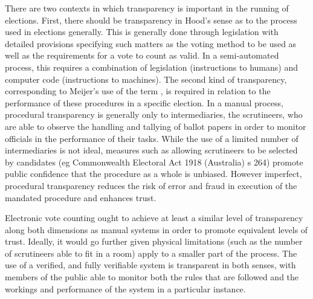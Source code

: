 There are two contexts in which transparency is important in the
running of elections. First, there should be transparency in Hood's
sense \citep{Hood:2001:T} as to the process used in elections generally. This is
generally done through legislation with detailed provisions
specifying such matters as the voting method to be used 
 as well as the requirements for a vote to count as valid.
In a semi-automated process, this requires a combination of
legislation (instructions to humans) and computer code (instructions
to machines). The second kind of transparency, corresponding to
Meijer’s use of the term \citep{Meijer:2014:T}, is required in relation to the
performance of these procedures in a specific election. In a manual
process, procedural transparency is generally only to
intermediaries, the scrutineers, who are able to observe the
handling and tallying of ballot papers in order to monitor officials
in the performance of their tasks. While the use of a limited number
of intermediaries is not ideal, measures such as allowing
scrutineers to be selected by candidates (eg Commonwealth Electoral
Act 1918 (Australia) s 264) promote public confidence that the
procedure as a whole is unbiased. However imperfect, procedural
transparency reduces the risk of error and fraud in execution of the
mandated procedure and enhances trust. 

Electronic vote counting ought to achieve at least a similar level
of transparency along both dimensions as manual systems in order to
promote equivalent levels of trust. Ideally, it would go further
given physical limitations (such as the number of scrutineers
able to fit in a room) apply to a smaller part of the process. The
use of a verified, and fully verifiable system is transparent in both senses, with members of
the public able to monitor both the rules that are followed
and the workings and performance of the system in a particular
instance. 

